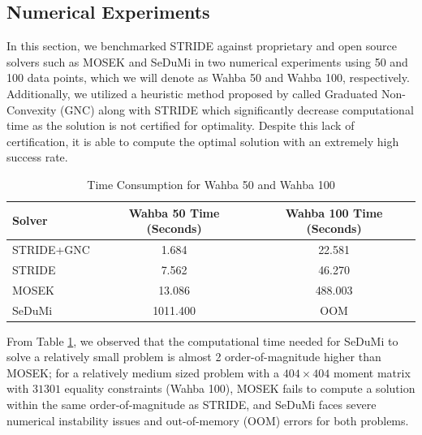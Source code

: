 \documentclass[12pt]{l4dc2021}
\begin{document}
    \subsection{Numerical Experiments} \label{sec:numExpWahba}
    In this section, we benchmarked STRIDE against proprietary and open source solvers such as MOSEK and SeDuMi in two numerical experiments using 50 and 100 data points, which we will denote as Wahba 50 and Wahba 100, respectively. Additionally, we utilized a heuristic method proposed by \cite{yang2021inexact} called Graduated Non-Convexity (GNC) along with STRIDE which significantly decrease computational time as the solution is not certified for optimality. Despite this lack of certification, it is able to compute the optimal solution with an extremely high success rate.

    \begin{table}[h]
    \centering
    \begin{tabular}{lcc}
        \toprule
        Solver & Wahba 50 Time (Seconds) & Wahba 100 Time (Seconds) \\ 
        \midrule
        STRIDE+GNC       & 1.684       & 22.581 \\
        STRIDE       & 7.562       & 46.270 \\
        MOSEK       & 13.086       & 488.003 \\
        SeDuMi       & 1011.400       & OOM \\
        \bottomrule
    \end{tabular}
    \caption{Time Consumption for Wahba 50 and Wahba 100}
    \label{tab:wahbatable}
    \end{table}

    From Table \ref{tab:wahbatable}, we observed that the computational time needed for SeDuMi to solve a relatively small problem is almost 2 order-of-magnitude higher than MOSEK; for a relatively medium sized problem with a $404\times404$ moment matrix with $31301$ equality constraints (Wahba 100), MOSEK fails to compute a solution within the same order-of-magnitude as STRIDE, and SeDuMi faces severe numerical instability 
    issues and out-of-memory (OOM) errors for both problems.




\end{document}
